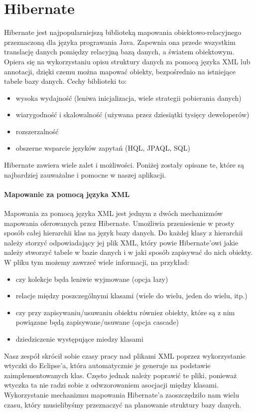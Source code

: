 \documentclass[licencjacka]{pracamgr}
\begin{document}
\section{Hibernate}
Hibernate jest najpopularniejszą biblioteką mapowania obiektowo-relacyjnego przeznaczoną dla języka prograwania Java.
Zapewnia ona przede wszystkim translację danych pomiędzy relacyjną bazą danych, a światem obiektowym. 
Opiera się na wykorzystaniu opisu struktury danych za pomocą języka XML lub annotacji, dzięki czemu można mapować obiekty, 
bezpośrednio na istniejące tabele bazy danych. Cechy biblioteki to: 
\begin{itemize}
\item wysoka wydajność (leniwa inicjalizacja, wiele strategii pobierania danych)
\item wiarygodność i skalowalność (używana przez dziesiątki tysięcy deweloperów)
\item rozszerzalność
\item obszerne wsparcie języków zapytań (HQL, JPAQL, SQL) 
\end{itemize}
Hibernate zawiera wiele zalet i możliwości. Poniżej zostały opisane te, które 
są najbardziej zauważalne i pomocne w naszej aplikacji.

\paragraph{Mapowanie za pomocą języka XML}
Mapowania za pomocą języka XML jest jednym z dwóch mechanizmów mapowania oferowanych przez Hibernate. Umożliwia przeniesienie 
w prosty sposób całej hierarchii klas na język bazy danych. Do każdej klasy z hierarchii należy storzyć odpowiadający jej plik XML, 
który powie Hibernate'owi jakie należy stworzyć tabele w bazie danych i w jaki sposób zapisywać do nich obiekty. W pliku tym możemy zawrzeć wiele informacji, na przykład:
\begin{itemize}
\item czy kolekcje będa leniwie wyjmowane (opcja lazy)
\item relacje między poszczególnymi klasami (wiele do wielu, jeden do wielu, itp.)
\item czy przy zapisywaniu/usuwaniu obiektu równiez obiekty, które są z nim powiązane będą zapisywane/usuwane (opcja cascade)
\item dziedziczenie występujące miedzy klasami
\end{itemize}
Nasz zespół skrócił sobie czasy pracy nad plikami XML poprzez wykorzystanie wtyczki do Eclipse'a, która automatycznie je generuje   
na podstawie zaimplementowanych klas. Często jednak należy poprawić te pliki, ponieważ wtyczka ta nie radzi sobie z odwzorowaniem 
asocjacji między klasami. Wykorzystanie mechanizmu mapowania Hibernate'a zaoszczędziło nam wielu czasu, który musielibyśmy przeznaczyć 
na planowanie struktury bazy danych.
\end{document}
